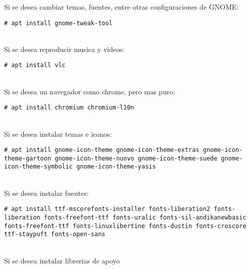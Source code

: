 Si se desea cambiar temas, fuentes, entre otras configuraciones de GNOME:
\begin{verbatim}
# apt install gnome-tweak-tool
\end{verbatim}
\\[1em]
Si se desea reproducir musica y videos:
\begin{verbatim}
# apt install vlc
\end{verbatim}
\\[1em]
Si se desea un navegador como chrome, pero mas puro:
\begin{verbatim}
# apt install chromium chromium-l10n
\end{verbatim}
\\[1em]
Si se desea instalar temas e iconos:
\begin{verbatim}
# apt install gnome-icon-theme gnome-icon-theme-extras gnome-icon-theme-gartoon gnome-icon-theme-nuovo gnome-icon-theme-suede gnome-icon-theme-symbolic gnome-icon-theme-yasis
\end{verbatim}
\\[1em]
Si se desea instalar fuentes:
\begin{verbatim}
# apt install ttf-mscorefonts-installer fonts-liberation2 fonts-liberation fonts-freefont-ttf fonts-uralic fonts-sil-andikanewbasic fonts-freefont-ttf fonts-linuxlibertine fonts-dustin fonts-croscore ttf-staypuft fonts-open-sans
\end{verbatim}
\\[1em]
Si se desea instalar librerias de apoyo
